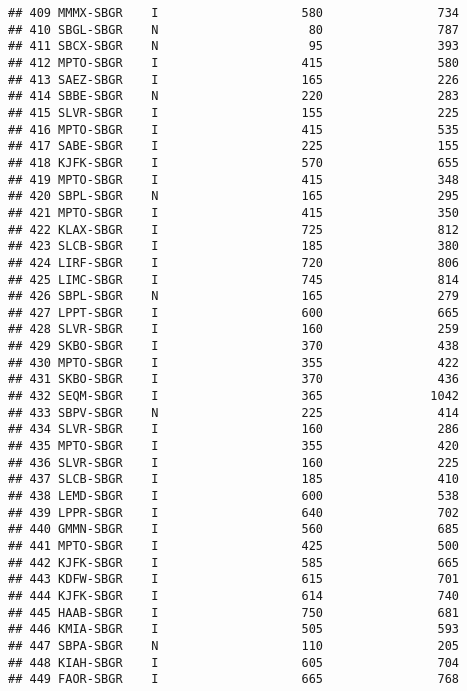 \documentclass[
]{article}
\begin{document}
\begin{verbatim}
## 409 MMMX-SBGR    I                    580                734
## 410 SBGL-SBGR    N                     80                787
## 411 SBCX-SBGR    N                     95                393
## 412 MPTO-SBGR    I                    415                580
## 413 SAEZ-SBGR    I                    165                226
## 414 SBBE-SBGR    N                    220                283
## 415 SLVR-SBGR    I                    155                225
## 416 MPTO-SBGR    I                    415                535
## 417 SABE-SBGR    I                    225                155
## 418 KJFK-SBGR    I                    570                655
## 419 MPTO-SBGR    I                    415                348
## 420 SBPL-SBGR    N                    165                295
## 421 MPTO-SBGR    I                    415                350
## 422 KLAX-SBGR    I                    725                812
## 423 SLCB-SBGR    I                    185                380
## 424 LIRF-SBGR    I                    720                806
## 425 LIMC-SBGR    I                    745                814
## 426 SBPL-SBGR    N                    165                279
## 427 LPPT-SBGR    I                    600                665
## 428 SLVR-SBGR    I                    160                259
## 429 SKBO-SBGR    I                    370                438
## 430 MPTO-SBGR    I                    355                422
## 431 SKBO-SBGR    I                    370                436
## 432 SEQM-SBGR    I                    365               1042
## 433 SBPV-SBGR    N                    225                414
## 434 SLVR-SBGR    I                    160                286
## 435 MPTO-SBGR    I                    355                420
## 436 SLVR-SBGR    I                    160                225
## 437 SLCB-SBGR    I                    185                410
## 438 LEMD-SBGR    I                    600                538
## 439 LPPR-SBGR    I                    640                702
## 440 GMMN-SBGR    I                    560                685
## 441 MPTO-SBGR    I                    425                500
## 442 KJFK-SBGR    I                    585                665
## 443 KDFW-SBGR    I                    615                701
## 444 KJFK-SBGR    I                    614                740
## 445 HAAB-SBGR    I                    750                681
## 446 KMIA-SBGR    I                    505                593
## 447 SBPA-SBGR    N                    110                205
## 448 KIAH-SBGR    I                    605                704
## 449 FAOR-SBGR    I                    665                768

\end{verbatim}
\end{document}
